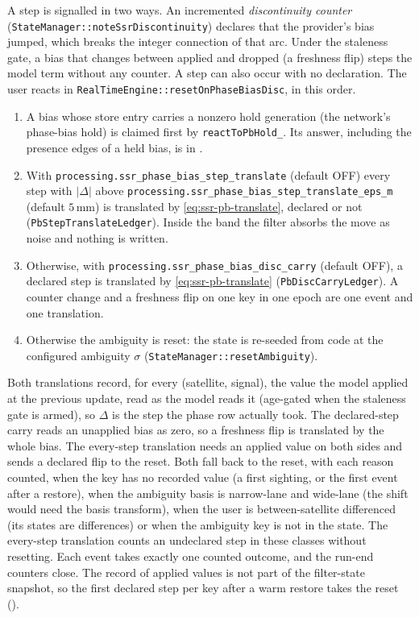 \documentclass[main.tex]{subfiles}
\begin{document}
A step is signalled in two ways. An incremented \emph{discontinuity counter}
(\texttt{StateManager::noteSsrDiscontinuity}) declares that the provider's
bias jumped, which breaks the integer connection of that arc. Under the
staleness gate, a bias that changes between applied and dropped (a freshness
flip) steps the model term without any counter. A step can also occur with no
declaration. The user reacts in \texttt{RealTimeEngine::resetOnPhaseBiasDisc},
in this order.
\begin{enumerate}[leftmargin=*, itemsep=0pt]
\item A bias whose store entry carries a nonzero hold generation (the
      network's phase-bias hold) is claimed first by \texttt{reactToPbHold\_}.
      Its answer, including the presence edges of a held bias, is in
      .
\item With \texttt{processing.ssr\_phase\_bias\_step\_translate} (default OFF)
      every step with $|\Delta|$ above
      \texttt{processing.ssr\_phase\_bias\_step\_translate\_eps\_m} (default
      $5$\,mm) is translated by \eqref{eq:ssr-pb-translate}, declared or not
      (\texttt{PbStepTranslateLedger}). Inside the band the filter absorbs the
      move as noise and nothing is written.
\item Otherwise, with \texttt{processing.ssr\_phase\_bias\_disc\_carry}
      (default OFF), a declared step is translated by
      \eqref{eq:ssr-pb-translate} (\texttt{PbDiscCarryLedger}). A counter
      change and a freshness flip on one key in one epoch are one event and
      one translation.
\item Otherwise the ambiguity is reset: the state is re-seeded from code at
      the configured ambiguity $\sigma$ (\texttt{StateManager::resetAmbiguity}).
\end{enumerate}
Both translations record, for every (satellite, signal), the value the model
applied at the previous update, read as the model reads it (age-gated when the
staleness gate is armed), so $\Delta$ is the step the phase row actually took.
The declared-step carry reads an unapplied bias as zero, so a freshness flip
is translated by the whole bias. The every-step translation needs an applied
value on both sides and sends a declared flip to the reset. Both fall back to
the reset, with each reason counted, when the key has no recorded value (a
first sighting, or the first event after a restore), when the ambiguity basis
is narrow-lane and wide-lane (the shift would need the basis transform), when
the user is between-satellite differenced (its states are differences) or
when the ambiguity key is not in the state. The every-step translation counts
an undeclared step in these classes without resetting. Each event takes
exactly one counted outcome, and the run-end counters close. The record of
applied values is not part of the filter-state snapshot, so the first
declared step per key after a warm restore takes the reset
().
\end{document}
